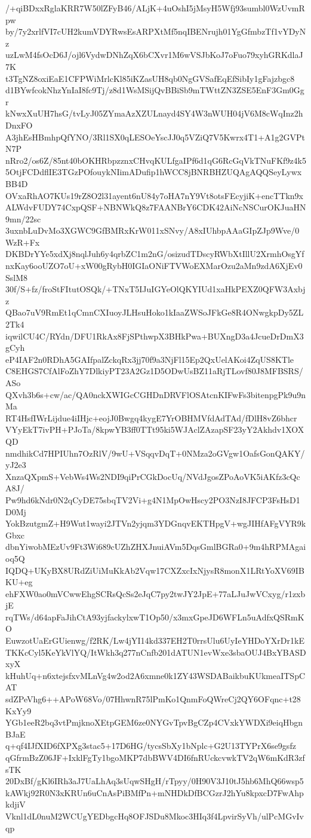 /+qiBDxxRglaKRR7W50lZFyB46/ALjK+4uOshI5jMsyH5Wfj93sumbl0WzUvmRpw
by/7y2xrlfVI7cUH2kumVDYRwsEsARPXtMf5nqIBENrujh01YgGfmbzTf1vYDyNz
uzLwM4fsOcD6J/ojl6VydwDNhZqX6bCXvr1M6wVSJbKoJ7oFuo79xyhGRKdlaJ7K
t3TgNZ8oxiEaE1CFPWiMrlcKl85iKZasUH8qb0NgGVSafEqEfSibIy1gFajzbgc8
d1BYwfcokNhzYnIaI8fc9Tj/z8d1WsMSijQvBBiSb9mTWttZN3ZSE5EnF3Gm0Ggr
kNwxXuUH7hsG/tvLyJ05ZYmaAzXZULnayd4SY4W3nWUH04jV6M8cWqInz2hDnxFO
A3jhEsHBmhpQfYNO/3Rl1SX0qLESOeYscJJ0q5VZiQ7V5Kwrx4T1+A1g2GVPtN7P
nRro2/os6Z/85nt40bOKHRbpzznxCHvqKULfgaIPf6d1qG6RcGqVkTNuFKf9z4k5
5OtjFCDdflIE3TGzPOfouykNIimADufip1hWCC8jBNRBHZUQAgAQQSeyLywxBB4D
OVxaRhAO7KUs19rZ8O2l31ayent6nU84y7oHA7nY9Vt8otsFEcyjiK+encTTkn9x
ALWdvFUDY74CxpQSF+NBNWkQ8z7FAANBrY6CDK42AiNcNSCurOKJuaHN9mn/22sc
3uxnbLuDvMo3XGWC9GfBMRxKrW011xSNvy/A8xIUhbpAAaGIpZJp9Wve/0WzR+Fx
DKBDrYYe5xdXj8nqlJuh6y4qrbZC1m2nG/osizudTDscyRWbXtIllU2XrmhOsgYf
nxKay6ooUZO7oU+xW00gRybH0IGIaONiFTVWoEXMarOzu2aMn9zdA6XjEv0SslM8
30f/S+fz/froStFItutOSQk/+TNxT5IJuIGYeOlQKYIUd1xaHkPEXZ0QFW3Axbjz
QBao7uV9RmEt1qCmnCXIuoyJLHsuHoko1kIaaZWSoJFkGe8R4ONwgkpDy5ZL2Tk4
iqwilCU4C/RYdn/DFU1RkAx8FjSPthwpX3BHkPwa+BUXngD3a4JcueDrDmX3gCyh
eP4IAF2n0RDhA5GAIfpalZckqRx3jj70f9a3NjFl15Ep2QxUelAKoi4ZqUS8KTle
C8EHGS7CfAlFoZhY7DlkiyPT23A2Gz1D5ODwUsBZ11aRjTLovf80J8MFBSRS/ASo
QXvh3b6s+cw/ac/QA0nckXWIGcCGHDnDRVFlOSAtcnKIFwFs3bitenpgPk9u9nMa
RT4HsfIWrLijdue4iIHjc+eojJ0Bwgq4kygE7YrOBHMVfdAdTAd/fDlH8vZ6bhcr
VYyEkT7ivPH+PJoTa/8kpwYB3ff0TTt95ki5WJAclZAzapSF23yY2Akhdv1XOXQD
nmdhikCd7HPIUhn7OzRlV/9wU+VSqqvDqT+0NMza2oGVgw1OafsGonQAKY/yJ2e3
XnzaQXpmS+VebWs4Ws2NDI9qiPrCGkDocUq/NVdJgosZPoAoVK5iAKfz3cQcA8J/
Pw9hd6kNdr0N2qCyDE75sbqTV2Vi+g4N1MpOwHscy2PO3NzI8JFCP3FsHsD1D0Mj
YokBzutgmZ+H9Wut1wayi2JTVn2yjqm3YDGnqvEKTHpgV+wgJIHfAFgVYR9kGbxc
dbnYiwobMEzUv9Ft3Wi689cUZhZHXJnuiAVm5DqsGmlBGRa0+9m4hRPMAgaioq5Q
IQDQ+UKyBX8URdZiUiMuKkAb2Vqw17CXZxcIxNjysR8monX1LRtYoXV69IBKU+eg
ehFXW0ao0mVCwwEhgSCRsQcSs2eJqC7py2twJY2JpE+77aLJuJwVCxyg/r1zxbjE
rqTWs/d64apFaJihCtA93yjfackylxwT1Op50/x3mxGpeJD6WFLn5uAdfxQSRmKO
EuwzotUaErGUienwg/f2RK/Lw4jYI14kd337EH2T0rrsUlu6UyIeYHDoYXrDr1kE
TKKcCyl5KeYkVlYQ/ItWkh3q277nCnfb201dATUN1evWxe3sbaOUJ4BxYBASDxyX
kHuhUq+n6xtejsfxvMLnVg4w2od2A6xmne0k1ZY43WSDABaikbuKUkmeaITSpCAT
sdZPeVhg6++APoW68Vo/07HhwnR75lPmKo1QnmFoQWreCj2QY6OFqnc+t28KxYy9
YGb1eeR2bq3vtPmjknoXEtpGEM6ze0NYGvTpvBgCZp4CVxkYWDXi9eiqHbgnBJaE
q+qf4IJfXID6fXPXg3stac5+17D6HG/tycsSbXy1bNplc+G2U13TYPrX6se9gsfz
qGfrmBzZ06JF+IxklFgTy1bgoMKP7dbBWV4DI6fnRUckcvwkTV2qW6mKdR3zfsTK
20DxBf/gKl6IRh3aJ7UaLhAq3sUqwSHgH/rTpyy/0H90V3J10tJ5hb6MhQ66wsp5
kAWkj92R0N3xKRUn6uCnAsPiBMfPn+mNHDkDfBCGzrJ2hYu8kpxcD7FwAhpkdjiV
Vknl1dL0nuM2WCUgYEDbgcHq8OFJSDu8Mkoc3HIq3f4LpvirSyVh/ulPcMGvIvqp
